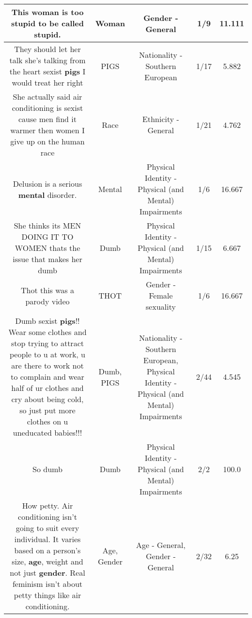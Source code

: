 \documentclass[11pt]{article}
\newlength\mylength
\begin{document}
\begin{center}
\begin{longtable}{|C{.65\mylength}|C{.30\mylength}|C{.12\mylength}|C{.12\mylength}|C{.12\mylength}|}
  \small This \textbf{woman} is too stupid to be called stupid.\normalsize   & Woman & Gender - General & 1/9 & 11.111 \\  \hline
  \small They should let her talk she's talking from the heart sexist \textbf{pigs} I would treat her right\normalsize   & PIGS & Nationality - Southern European & 1/17 & 5.882 \\  \hline
  \small She actually said air conditioning is sexist cause men find it warmer then women I give up on the human race\normalsize   & Race & Ethnicity - General & 1/21 & 4.762 \\  \hline
  \small Delusion is a serious \textbf{mental} disorder.\normalsize   & Mental & Physical Identity - Physical (and Mental) Impairments & 1/6 & 16.667 \\  \hline
  \small She thinks its MEN DOING IT TO WOMEN thats the issue that makes her dumb\normalsize   & Dumb & Physical Identity - Physical (and Mental) Impairments & 1/15 & 6.667 \\  \hline
  \small Thot this was a parody video\normalsize   & THOT & Gender - Female sexuality & 1/6 & 16.667 \\  \hline
  \small Dumb sexist \textbf{pigs}!! Wear some clothes and stop trying to attract people to u at work, u are there to work not to complain and wear half of ur clothes and cry about being cold, so just put more clothes on u uneducated babies!!!\normalsize   & Dumb, PIGS & Nationality - Southern European, Physical Identity - Physical (and Mental) Impairments & 2/44 & 4.545 \\  \hline
  \small So dumb\normalsize   & Dumb & Physical Identity - Physical (and Mental) Impairments & 2/2 & 100.0 \\  \hline
  \small How petty. Air conditioning isn't going to suit every individual. It varies based on a person's size, \textbf{age}, weight and not just \textbf{gender}. Real feminism isn't about petty things like air conditioning.\normalsize   & Age, Gender & Age - General, Gender - General & 2/32 & 6.25 \\  \hline

\end{longtable}
\end{center}
\end{document}
